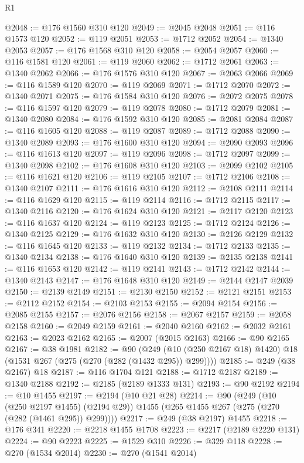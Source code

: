 \begin{lexlean}{R1}
\begin{coremodule}
@2048 := @176 @1560 @310 @120
@2049 := @2045 @2048
@2051 := @116 @1573 @120
@2052 := @119 @2051
@2053 := @1712 @2052
@2054 := @1340 @2053
@2057 := @176 @1568 @310 @120
@2058 := @2054 @2057
@2060 := @116 @1581 @120
@2061 := @119 @2060
@2062 := @1712 @2061
@2063 := @1340 @2062
@2066 := @176 @1576 @310 @120
@2067 := @2063 @2066
@2069 := @116 @1589 @120
@2070 := @119 @2069
@2071 := @1712 @2070
@2072 := @1340 @2071
@2075 := @176 @1584 @310 @120
@2076 := @2072 @2075
@2078 := @116 @1597 @120
@2079 := @119 @2078
@2080 := @1712 @2079
@2081 := @1340 @2080
@2084 := @176 @1592 @310 @120
@2085 := @2081 @2084
@2087 := @116 @1605 @120
@2088 := @119 @2087
@2089 := @1712 @2088
@2090 := @1340 @2089
@2093 := @176 @1600 @310 @120
@2094 := @2090 @2093
@2096 := @116 @1613 @120
@2097 := @119 @2096
@2098 := @1712 @2097
@2099 := @1340 @2098
@2102 := @176 @1608 @310 @120
@2103 := @2099 @2102
@2105 := @116 @1621 @120
@2106 := @119 @2105
@2107 := @1712 @2106
@2108 := @1340 @2107
@2111 := @176 @1616 @310 @120
@2112 := @2108 @2111
@2114 := @116 @1629 @120
@2115 := @119 @2114
@2116 := @1712 @2115
@2117 := @1340 @2116
@2120 := @176 @1624 @310 @120
@2121 := @2117 @2120
@2123 := @116 @1637 @120
@2124 := @119 @2123
@2125 := @1712 @2124
@2126 := @1340 @2125
@2129 := @176 @1632 @310 @120
@2130 := @2126 @2129
@2132 := @116 @1645 @120
@2133 := @119 @2132
@2134 := @1712 @2133
@2135 := @1340 @2134
@2138 := @176 @1640 @310 @120
@2139 := @2135 @2138
@2141 := @116 @1653 @120
@2142 := @119 @2141
@2143 := @1712 @2142
@2144 := @1340 @2143
@2147 := @176 @1648 @310 @120
@2149 := @2144 @2147 @2039
@2150 := @2139 @2149
@2151 := @2130 @2150
@2152 := @2121 @2151
@2153 := @2112 @2152
@2154 := @2103 @2153
@2155 := @2094 @2154
@2156 := @2085 @2155
@2157 := @2076 @2156
@2158 := @2067 @2157
@2159 := @2058 @2158
@2160 := @2049 @2159
@2161 := @2040 @2160
@2162 := @2032 @2161
@2163 := @2023 @2162
@2165 := @2007 (@2015 @2163)
@2166 := @90 @2165
@2167 := @38 @1981
@2182 := @90
    (@249 (@10 (@250 @2167 @18) @1420) @18 (@1531 @267 (@275 (@270 (@282 (@1432 @295)) @299))))
@2185 := @249 (@38 @2167) @18
@2187 := @116 @1704 @121
@2188 := @1712 @2187
@2189 := @1340 @2188
@2192 := @2185 (@2189 @1333 @131)
@2193 := @90 @2192
@2194 := @10 @1455
@2197 := @2194 (@10 @21 @28)
@2214 := @90
    (@249
      (@10 (@250 @2197 @1455) (@2194 @29))
      @1455
      (@265 @1455 @267 (@275 (@270 (@282 (@1461 @295)) @299))))
@2217 := @249 (@38 @2197) @1455
@2218 := @176 @341
@2220 := @2218 @1455 @1708
@2223 := @2217 (@2189 @2220 @131)
@2224 := @90 @2223
@2225 := @1529 @310
@2226 := @329 @118
@2228 := @270 (@1534 @2014)
@2230 := @270 (@1541 @2014)

\end{coremodule}
\end{lexlean}
